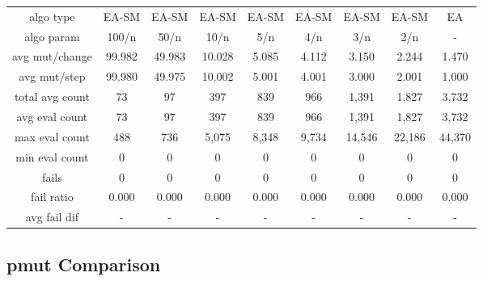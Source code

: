 \begin{tabular}[h]{ccccccccc}
algo type&         EA-SM&  EA-SM&  EA-SM&  EA-SM&  EA-SM&  EA-SM&  EA-SM&     EA\\
algo param&        100/n&   50/n&   10/n&    5/n&    4/n&    3/n&    2/n&      -\\
avg mut/change&   99.982& 49.983& 10.028&  5.085&  4.112&  3.150&  2.244&  1.470\\
avg mut/step&     99.980& 49.975& 10.002&  5.001&  4.001&  3.000&  2.001&  1.000\\
\hline
total avg count&      73&     97&    397&    839&    966&  1,391&  1,827&  3,732\\
avg eval count&       73&     97&    397&    839&    966&  1,391&  1,827&  3,732\\
max eval count&      488&    736&  5,075&  8,348&  9,734& 14,546& 22,186& 44,370\\
min eval count&        0&      0&      0&      0&      0&      0&      0&      0\\
\hline
fails&                 0&      0&      0&      0&      0&      0&      0&      0\\
fail ratio&        0.000&  0.000&  0.000&  0.000&  0.000&  0.000&  0.000&  0.000\\
avg fail dif&          -&      -&      -&      -&      -&      -&      -&      -\\
\end{tabular}


\subsection{pmut Comparison}


